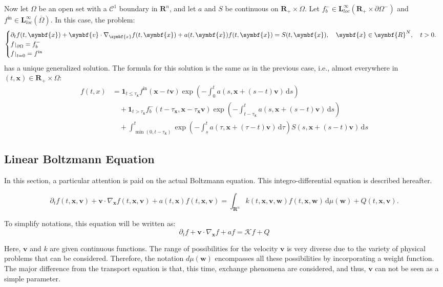 \documentclass[a4paper, 11pt]{article}
\newcommand{\bm}{\symbf}
\newcommand{\di}{\ensuremath{\, \mathrm{d}}}
\def\restriction#1#2{\mathchoice
	{\setbox1\hbox{${\displaystyle #1}_{\scriptstyle #2}$}
		\restrictionaux{#1}{#2}}
	{\setbox1\hbox{${\textstyle #1}_{\scriptstyle #2}$}
		\restrictionaux{#1}{#2}}
	{\setbox1\hbox{${\scriptstyle #1}_{\scriptscriptstyle #2}$}
		\restrictionaux{#1}{#2}}
	{\setbox1\hbox{${\scriptscriptstyle #1}_{\scriptscriptstyle #2}$}
		\restrictionaux{#1}{#2}}}
\def\restrictionaux#1#2{{#1\,\smash{\vrule height .8\ht1 depth .85\dp1}}_{\,#2}}
\begin{document}
Now let $\Omega$ be an open set with a $\mathcal{C}^1$ boundary in $\bm{R}^n$, and let $a$ and $S$ be continuous on $\bm{R}_+ \times \Omega$. Let $f_b^- \in \mathbf{L}_{loc}^{\infty}(\bm{R}_+ \times \partial \Omega^-)$ and $f^{\mathrm{in}} \in \mathbf{L}_{loc}^{\infty}(\overline{\Omega})$.
In this case, the problem:
\[
\begin{cases}
\partial_t f(t,\bm{x})+\bm{v} \cdot \nabla_{\bm{x}} f(t,\bm{x})+ a(t,\bm{x})f(t,\bm{x})=S(t,\bm{x}), \quad \bm{x} \in \bm{R}^N, \quad t>0.\\
\restriction{f}{\partial \Omega}= f_b^-\\
\restriction{f}{t=0}= f^{\mathrm{in}}
\end{cases}
\]
has a unique generalized solution. The formula for this solution is the same as in the previous case, i.e., almost everywhere in $(t,\bm{x}) \in \bm{R}_+ \times \Omega$:
\[
\boxed{
	\begin{aligned}
	f(t,x) &= \mathbf{1}_{t \leq \tau_{\bm{x}}} f^{\mathrm{in}} (\bm{x}-t\bm{v}) \exp\left(-\int_0^t a(s,\bm{x}+(s-t)\bm{v})\di s\right) \\
	&\quad + \mathbf{1}_{t > \tau_{\bm{x}}} f_b^- (t-\tau_{\bm{x}},\bm{x}-\tau_{\bm{x}} \bm{v}) \exp\left(-\int_{t-\tau_{\bm{x}}}^t a(s,\bm{x}+(s-t)\bm{v})\di s\right) \\
	&\quad + \int_{\min(0,t-\tau_{\bm{x}})}^t \exp\left(-\int_{s}^{t}a(\tau,\bm{x}+(\tau-t)\bm{v})\di\tau\right) S(s,\bm{x}+(s-t)\bm{v})\di s
	\end{aligned}}
\]


\subsection{Linear Boltzmann Equation}

In this section, a particular attention is paid on the actual Boltzmann equation. This integro-differential equation is described hereafter.

\begin{equation} \label{Boltzmann}
\partial_t f(t,\bm{x},\bm{v})+ \bm{v} \cdot \nabla_{\bm{x}} f(t,\bm{x},\bm{v}) + a(t,\bm{x})f(t,\bm{x},\bm{v}) = \int_{\bm{R}^n} k(t,\bm{x},\bm{v},\bm{w})f(t,\bm{x},\bm{w})\di\mu(\bm{w})+Q(t,\bm{x},\bm{v}).
\end{equation}

To simplify notations, this equation will be written as: 
\[ \partial_t f + \bm{v} \cdot \nabla_{\bm{x}} f + a f = \mathcal{K} f +Q  \]

Here, $\bm{v}$ and $k$ are given continuous functions. The range of possibilities for the velocity $\bm{v}$ is very diverse due to the variety of physical problems that can be considered. Therefore, the notation $d\mu(\bm{w})$ encompasses all these possibilities by incorporating a weight function. The major difference from the transport equation is that, this time, exchange phenomena are considered, and thus, $\bm{v}$ can not be seen as a simple parameter.
\end{document}
